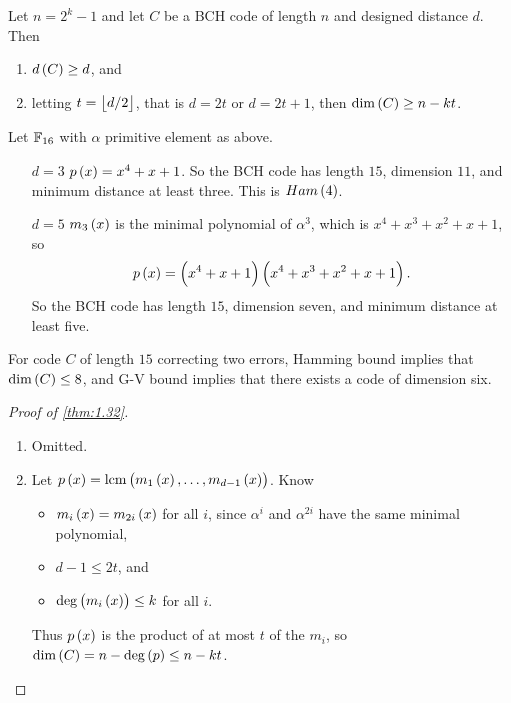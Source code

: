 \begin{theorem}
\label{thm:1.32}
Let $ n = 2^k - 1 $ and let $ C $ be a BCH code of length $ n $ and designed distance $ d $. Then
\begin{enumerate}
\item $ d\br{C} \ge d $, and
\item letting $ t = \left\lfloor d / 2 \right\rfloor $, that is $ d = 2t $ or $ d = 2t + 1 $, then $ \dim\br{C} \ge n - kt $.
\end{enumerate}
\end{theorem}

\begin{example*}
Let $ \mathbb{F}_{16} $ with $ \alpha $ primitive element as above.
\begin{itemize}
\item[$ d = 3 $] $ p\br{x} = x^4 + x + 1 $. So the BCH code has length $ 15 $, dimension $ 11 $, and minimum distance at least three. This is $ Ham\br{4} $.
\item[$ d = 5 $] $ m_3\br{x} $ is the minimal polynomial of $ \alpha^3 $, which is $ x^4 + x^3 + x^2 + x + 1 $, so
$$ p\br{x} = \br{x^4 + x + 1}\br{x^4 + x^3 + x^2 + x + 1}. $$
So the BCH code has length $ 15 $, dimension seven, and minimum distance at least five.
\end{itemize}
\end{example*}

\begin{note*}
For code $ C $ of length $ 15 $ correcting two errors, Hamming bound implies that $ \dim\br{C} \le 8 $, and G-V bound implies that there exists a code of dimension six.
\end{note*}

\begin{proof}[Proof of \ref{thm:1.32}]
\hfill
\begin{enumerate}
\item Omitted.
\item Let $ p\br{x} = \mathrm{lcm}\br{m_1\br{x}, \dots, m_{d - 1}\br{x}} $. Know
\begin{itemize}
\item $ m_i\br{x} = m_{2i}\br{x} $ for all $ i $, since $ \alpha^i $ and $ \alpha^{2i} $ have the same minimal polynomial,
\item $ d - 1 \le 2t $, and
\item $ \deg\br{m_i\br{x}} \le k $ for all $ i $.
\end{itemize}
Thus $ p\br{x} $ is the product of at most $ t $ of the $ m_i $, so $ \dim\br{C} = n - \deg\br{p} \le n - kt $.
\end{enumerate}
\end{proof}


